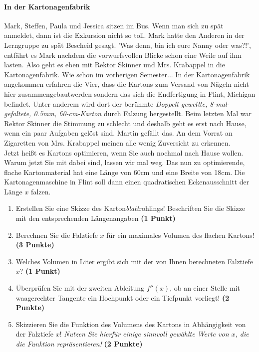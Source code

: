 \documentclass[a4paper, 9pt]{scrartcl}\usepackage[]{graphicx}\usepackage[]{xcolor}
\begin{document}
\ifcollection
\paragraph{In der Kartonagenfabrik}
\fi



Mark, Steffen, Paula und Jessica sitzen im Bus. Wenn man sich zu spät anmeldet, dann ist die Exkursion nicht so toll. Mark hatte den Anderen in der Lerngruppe zu spät Bescheid gesagt. 'Was denn, bin ich eure Nanny oder was?!', entfährt es Mark nachdem die vorwurfsvollen Blicke schon eine Weile auf ihm lasten. Also geht es eben mit Rektor Skinner und Mrs. Krabappel in die Kartonagenfabrik. Wie schon im vorherigen Semester... In der Kartonagenfabrik angekommen erfahren die Vier, dass die Kartons zum Versand von Nägeln nicht hier zusammengebautwerden sondern das sich die Endfertigung in Flint, Michigan befindet. Unter anderem wird dort der berühmte \textit{Doppelt gewellte, 8-mal-gefaltete, 0.5mm, 60-cm-Karton} durch
Falzung hergestellt. Beim letzten Mal war Rektor Skinner die Stimmung zu schlecht und deshalb geht es erst nach Hause, wenn ein paar Aufgaben gelöst sind. Martin gefällt das. An dem Vorrat an Zigaretten von Mrs. Krabappel meinen alle wenig Zuversicht zu erkennen.\\

Jetzt heißt es Kartons optimieren, wenn Sie auch nochmal nach Hause wollen. Warum jetzt Sie mit dabei sind, lassen wir mal weg. Das nun zu optimierende, flache Kartonmaterial hat eine Länge von 60cm und eine Breite von 18cm. Die Kartonagenmaschine in Flint soll dann einen quadratischen Eckenausschnitt der Länge $x$ falzen.

\begin{enumerate}
\item Erstellen Sie eine Skizze des Karton\textit{blatt}rohlings! Beschriften Sie die Skizze mit den entsprechenden Längenangaben \textbf{(1 Punkt)}
\item Berechnen Sie die Falztiefe $x$ für ein maximales Volumen des flachen Kartons! \textbf{(3 Punkte)}
\item Welches Volumen in Liter ergibt sich mit der von Ihnen berechneten Falztiefe $x$?  \textbf{(1 Punkt)}
\item Überprüfen Sie mit der zweiten Ableitung $f''(x)$, ob an einer Stelle mit waagerechter Tangente ein Hochpunkt oder ein Tiefpunkt vorliegt! \textbf{(2 Punkte)}
\item Skizzieren Sie die Funktion des Volumens des Kartons in Abhängigkeit von der Falztiefe $x$! \textit{Nutzen Sie hierfür einige sinnvoll gewählte Werte von $x$, die die Funktion repräsentieren!} \textbf{(2 Punkte)}
\end{enumerate}
\end{document}
